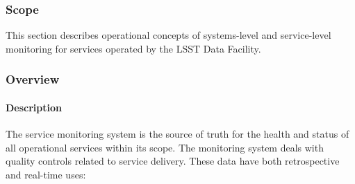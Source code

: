 \subsubsection{Scope}
This section describes operational concepts of systems-level and service-level
monitoring for services operated by the LSST Data Facility.

\subsubsection{Overview}

\paragraph{Description}

The service monitoring system is the source of truth for the health and status
of all operational services within its scope. The monitoring system deals with
quality controls related to service delivery. These data have both retrospective
and real-time uses:

